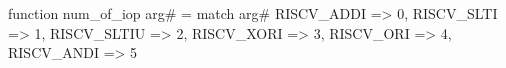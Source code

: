 function num_of_iop arg# = match arg# {
  RISCV_ADDI => 0,
  RISCV_SLTI => 1,
  RISCV_SLTIU => 2,
  RISCV_XORI => 3,
  RISCV_ORI => 4,
  RISCV_ANDI => 5
}
